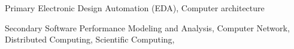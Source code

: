 

\begin{cvskills}

  \cvskill
    {Primary} %
    {Electronic Design Automation (EDA), Computer architecture}

  \cvskill
    {Secondary} %
    {Software Performance Modeling and Analysis, Computer Network, Distributed Computing, Scientific Computing, }

\end{cvskills}
